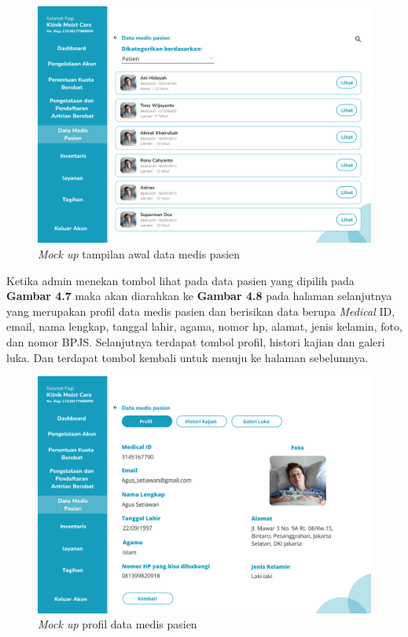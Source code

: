 \begin{enumerate}
	\begin{figure}[H]
		\centering
		\includegraphics[width=12cm]{gambar/mockup_web/Proses Pengobatan 1.png}
		\caption{\emph{Mock up} tampilan awal data medis pasien}
		\label{Gambar:pengelolaanantrian2}
	\end{figure}
	
	Ketika admin menekan tombol lihat pada data pasien yang dipilih pada \textbf{Gambar 4.7} maka akan diarahkan ke \textbf{Gambar 4.8} pada halaman selanjutnya yang merupakan profil data medis pasien dan berisikan data berupa \emph{Medical} ID, email, nama lengkap, tanggal lahir, agama, nomor hp, alamat, jenis kelamin, foto, dan nomor BPJS. Selanjutnya terdapat tombol profil, histori kajian dan galeri luka. Dan terdapat tombol kembali untuk menuju ke halaman sebelumnya.
	
	\begin{figure}[H]
		\centering
		\includegraphics[width=12cm]{gambar/mockup_web/Proses Pengobatan 2.png}
		\caption{\emph{Mock up} profil data medis pasien}
		\label{Gambar:pengelolaanantrian2}
	\end{figure}
	

\end{enumerate}
